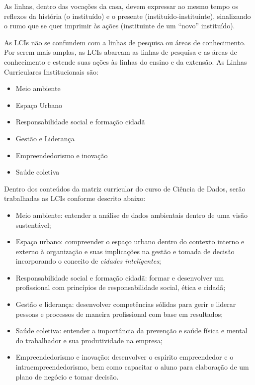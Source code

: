 \documentclass[a4paper, 12pt, openright, oneside, german, french, english, brazil]{abntex2}
\begin{document}
As linhas, dentro das vocações da casa, devem expressar ao mesmo tempo os reflexos da história (o instituído) e o presente (instituído-instituinte), sinalizando o rumo que se quer imprimir às ações (instituinte de um ``novo'' instituído).

As LCIs não se confundem com a linhas de pesquisa ou áreas de conhecimento. Por serem mais amplas, as LCIs abarcam as linhas de pesquisa e as áreas de conhecimento e estende suas ações às linhas do ensino e da extensão. As Linhas Curriculares Institucionais são:

\begin{itemize}
\item Meio ambiente
\item Espaço Urbano
\item Responsabilidade social e formação cidadã
\item Gestão e Liderança
\item Empreendedorismo e inovação
\item Saúde coletiva
\end{itemize}

Dentro dos conteúdos da matriz curricular do curso de Ciência de Dados, serão trabalhadas as LCIs conforme descrito abaixo:

\begin{itemize}
\item Meio ambiente: entender a análise de dados ambientais dentro de uma visão sustentável;
\item Espaço urbano: compreender o espaço urbano dentro do contexto interno e externo à organização e suas implicações na gestão e tomada de decisão incorporando o conceito de \textit{cidades inteligentes};
\item Responsabilidade social e formação cidadã: formar e desenvolver um profissional com princípios de responsabilidade social, ética e cidadã;
\item Gestão e liderança: desenvolver competências sólidas para gerir e liderar pessoas e processos de maneira profissional com base em resultados;
\item Saúde coletiva: entender a importância da prevenção e saúde física e mental do trabalhador e sua produtividade na empresa;
\item Empreendedorismo e inovação: desenvolver o espírito empreendedor e o intraempreendedorismo, bem como capacitar o aluno para elaboração de um plano de negócio e tomar decisão.
\end{itemize}
\end{document}
